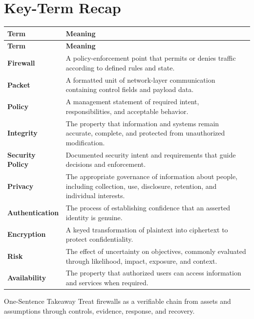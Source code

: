 \documentclass[11pt,letterpaper]{article}
\begin{document}
\section*{Key-Term Recap}
\begin{longtable}{>{\raggedright\arraybackslash}p{}>{\raggedright\arraybackslash}p{}}
\toprule\rowcolor{Navy}\color{white}\textbf{Term} & \color{white}\textbf{Meaning}\\\midrule
\endfirsthead
\toprule\rowcolor{Navy}\color{white}\textbf{Term} & \color{white}\textbf{Meaning}\\\midrule
\endhead
\textbf{Firewall} & A policy-enforcement point that permits or denies traffic according to defined rules and state. \\\midrule
\textbf{Packet} & A formatted unit of network-layer communication containing control fields and payload data. \\\midrule
\textbf{Policy} & A management statement of required intent, responsibilities, and acceptable behavior. \\\midrule
\textbf{Integrity} & The property that information and systems remain accurate, complete, and protected from unauthorized modification. \\\midrule
\textbf{Security Policy} & Documented security intent and requirements that guide decisions and enforcement. \\\midrule
\textbf{Privacy} & The appropriate governance of information about people, including collection, use, disclosure, retention, and individual interests. \\\midrule
\textbf{Authentication} & The process of establishing confidence that an asserted identity is genuine. \\\midrule
\textbf{Encryption} & A keyed transformation of plaintext into ciphertext to protect confidentiality. \\\midrule
\textbf{Risk} & The effect of uncertainty on objectives, commonly evaluated through likelihood, impact, exposure, and context. \\\midrule
\textbf{Availability} & The property that authorized users can access information and services when required. \\\midrule
\bottomrule
\end{longtable}
\begin{CornellExamBox}{One-Sentence Takeaway}
Treat firewalls as a verifiable chain from assets and assumptions through controls, evidence, response, and recovery.
\end{CornellExamBox}
\end{document}
